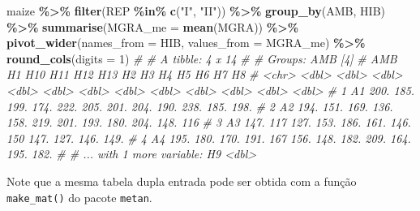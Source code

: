\documentclass[
]{book}
\newenvironment{Shaded}{\begin{snugshade}}{\end{snugshade}}
\newcommand{\CommentTok}[1]{\textcolor[rgb]{0.56,0.35,0.01}{\textit{#1}}}
\newcommand{\DataTypeTok}[1]{\textcolor[rgb]{0.13,0.29,0.53}{#1}}
\newcommand{\DecValTok}[1]{\textcolor[rgb]{0.00,0.00,0.81}{#1}}
\newcommand{\KeywordTok}[1]{\textcolor[rgb]{0.13,0.29,0.53}{\textbf{#1}}}
\newcommand{\NormalTok}[1]{#1}
\newcommand{\OperatorTok}[1]{\textcolor[rgb]{0.81,0.36,0.00}{\textbf{#1}}}
\newcommand{\StringTok}[1]{\textcolor[rgb]{0.31,0.60,0.02}{#1}}
\numberwithin{equation}{section}
\begin{document}
\begin{Shaded}
\begin{Highlighting}[]
\NormalTok{maize }\OperatorTok{\%\textgreater{}\%}
\StringTok{  }\KeywordTok{filter}\NormalTok{(REP }\OperatorTok{\%in\%}\StringTok{ }\KeywordTok{c}\NormalTok{(}\StringTok{"I"}\NormalTok{, }\StringTok{"II"}\NormalTok{)) }\OperatorTok{\%\textgreater{}\%}
\StringTok{  }\KeywordTok{group\_by}\NormalTok{(AMB, HIB) }\OperatorTok{\%\textgreater{}\%}
\StringTok{  }\KeywordTok{summarise}\NormalTok{(}\DataTypeTok{MGRA\_me =} \KeywordTok{mean}\NormalTok{(MGRA)) }\OperatorTok{\%\textgreater{}\%}
\StringTok{  }\KeywordTok{pivot\_wider}\NormalTok{(}\DataTypeTok{names\_from =}\NormalTok{ HIB, }\DataTypeTok{values\_from =}\NormalTok{ MGRA\_me) }\OperatorTok{\%\textgreater{}\%}
\StringTok{  }\KeywordTok{round\_cols}\NormalTok{(}\DataTypeTok{digits =} \DecValTok{1}\NormalTok{)}
\CommentTok{\# \# A tibble: 4 x 14}
\CommentTok{\# \# Groups:   AMB [4]}
\CommentTok{\#   AMB      H1   H10   H11   H12   H13    H2    H3    H4    H5    H6    H7    H8}
\CommentTok{\#   \textless{}chr\textgreater{} \textless{}dbl\textgreater{} \textless{}dbl\textgreater{} \textless{}dbl\textgreater{} \textless{}dbl\textgreater{} \textless{}dbl\textgreater{} \textless{}dbl\textgreater{} \textless{}dbl\textgreater{} \textless{}dbl\textgreater{} \textless{}dbl\textgreater{} \textless{}dbl\textgreater{} \textless{}dbl\textgreater{} \textless{}dbl\textgreater{}}
\CommentTok{\# 1 A1     200.  185.  199.  174.  222.  205.  201.  204.  190.  238.  185.  198.}
\CommentTok{\# 2 A2     194.  151.  169.  136.  158.  219.  201.  193.  180.  204.  148.  116 }
\CommentTok{\# 3 A3     147.  117   127.  153.  186.  161.  146.  150   147.  127.  146.  149.}
\CommentTok{\# 4 A4     195.  180.  170.  191.  167   156.  148.  182.  209.  164.  195.  182.}
\CommentTok{\# \# ... with 1 more variable: H9 \textless{}dbl\textgreater{}}
\end{Highlighting}
\end{Shaded}

Note que a mesma tabela dupla entrada pode ser obtida com a função \texttt{make\_mat()} do pacote \texttt{metan}.
\end{document}

